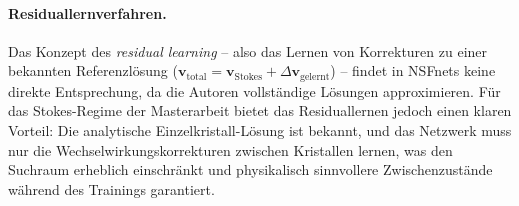 \documentclass[a4paper,12pt]{article}
\begin{document}
\paragraph{Residuallernverfahren.}
Das Konzept des \emph{residual learning} -- also das Lernen von Korrekturen zu
einer bekannten Referenzlösung ($\mathbf{v}_\text{total} = \mathbf{v}_\text{Stokes}
+ \Delta\mathbf{v}_\text{gelernt}$) -- findet in NSFnets keine direkte
Entsprechung, da die Autoren vollständige Lösungen approximieren. Für das
Stokes-Regime der Masterarbeit bietet das Residuallernen jedoch einen klaren
Vorteil: Die analytische Einzelkristall-Lösung ist bekannt, und das Netzwerk
muss nur die Wechselwirkungskorrekturen zwischen Kristallen lernen, was den
Suchraum erheblich einschränkt und physikalisch sinnvollere Zwischenzustände
während des Trainings garantiert.
\end{document}
